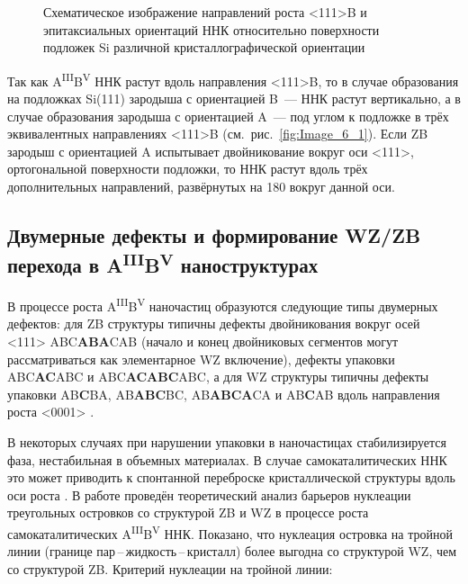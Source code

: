 \begin{figure}[ht]   \caption{Схематическое
			изображение направлений роста <111>B и эпитаксиальных ориентаций ННК
			относительно поверхности подложек Si различной кристаллографической
	ориентации}\label{fig:Image_6} \end{figure}

Так как A\textsuperscript{III}B\textsuperscript{V} ННК растут вдоль направления
<111>B, то в случае образования на подложках Si(111) зародыша с ориентацией
B~--- ННК растут вертикально, а в случае образования зародыша с ориентацией
A~--- под углом к подложке в трёх эквивалентных направлениях <111>B
(см.~рис.~\cref{fig:Image_6_1}). Если ZB зародыш с ориентацией A испытывает
двойникование вокруг оси <111>, ортогональной поверхности подложки, то ННК
растут вдоль трёх дополнительных направлений, развёрнутых на 180{\textdegree}
вокруг данной оси.

\subsection{Двумерные дефекты и формирование WZ/ZB перехода в
A\textsuperscript{III}B\textsuperscript{V}
наноструктурах}\label{subsec:ch1/sec2/sub5}

В процессе роста A\textsuperscript{III}B\textsuperscript{V} наночастиц
образуются следующие типы двумерных дефектов: для ZB структуры типичны дефекты
двойникования вокруг осей <111> ABC\textbf{ABA}CAB (начало и конец двойниковых
сегментов могут рассматриваться как элементарное WZ включение), дефекты
упаковки ABC\textbf{AC}ABC и ABC\textbf{ACABC}ABC, а для WZ структуры типичны
дефекты упаковки AB\textbf{C}BA, AB\textbf{ABC}BC, AB\textbf{ABCA}CA и
AB\textbf{C}AB вдоль направления роста <0001> \cite{knoll2014,
sourribes2014mobility}.

В некоторых случаях при нарушении упаковки в наночастицах стабилизируется фаза,
нестабильная в объемных материалах. В случае самокаталитических ННК это
может приводить к спонтанной переброске кристаллической структуры вдоль оси
роста \cite{Cirlin2010}. В работе \cite{Glas2007} проведён теоретический анализ
барьеров нуклеации треугольных островков со структурой ZB и WZ в процессе роста
самокаталитических A\textsuperscript{III}B\textsuperscript{V} ННК. Показано,
что нуклеация островка на тройной линии (границе
пар\,--\,жидкость\,--\,кристалл) более выгодна со структурой WZ, чем со
структурой ZB. Критерий нуклеации на тройной линии:

